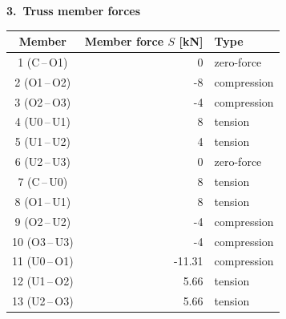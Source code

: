 \documentclass[a4paper,11pt]{article}
\begin{document}
\par\medskip\textbf{3.\ Truss member forces}\par
\begin{center}\renewcommand{\arraystretch}{1.15}
\begin{tabular}{c r l}
\toprule
Member & Member force $S$ [kN] & Type \\
\midrule
  1 (C\,--\,O1) & 0 & zero-force \\
  2 (O1\,--\,O2) & -8 & compression \\
  3 (O2\,--\,O3) & -4 & compression \\
  4 (U0\,--\,U1) & 8 & tension \\
  5 (U1\,--\,U2) & 4 & tension \\
  6 (U2\,--\,U3) & 0 & zero-force \\
  7 (C\,--\,U0) & 8 & tension \\
  8 (O1\,--\,U1) & 8 & tension \\
  9 (O2\,--\,U2) & -4 & compression \\
  10 (O3\,--\,U3) & -4 & compression \\
  11 (U0\,--\,O1) & -11.31 & compression \\
  12 (U1\,--\,O2) & 5.66 & tension \\
  13 (U2\,--\,O3) & 5.66 & tension \\
\bottomrule
\end{tabular}\end{center}
\end{document}
